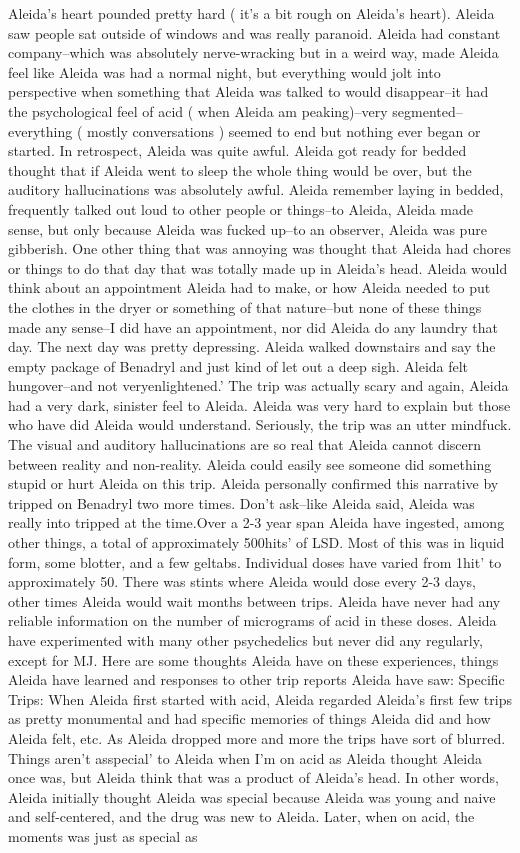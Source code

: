 \documentclass[12pt]{book}
\begin{document}
Aleida's heart pounded pretty hard ( it's a bit rough on Aleida's heart). Aleida saw people sat outside of windows and was really paranoid. Aleida had constant company--which was absolutely nerve-wracking but in a weird way, made Aleida feel like Aleida was had a normal night, but everything would jolt into perspective when something that Aleida was talked to would disappear--it had the psychological feel of acid ( when Aleida am peaking)--very segmented--everything ( mostly conversations ) seemed to end but nothing ever began or started. In retrospect, Aleida was quite awful. Aleida got ready for bedded thought that if Aleida went to sleep the whole thing would be over, but the auditory hallucinations was absolutely awful. Aleida remember laying in bedded, frequently talked out loud to other people or things--to Aleida, Aleida made sense, but only because Aleida was fucked up--to an observer, Aleida was pure gibberish. One other thing that was annoying was thought that Aleida had chores or things to do that day that was totally made up in Aleida's head. Aleida would think about an appointment Aleida had to make, or how Aleida needed to put the clothes in the dryer or something of that nature--but none of these things made any sense--I did have an appointment, nor did Aleida do any laundry that day. The next day was pretty depressing. Aleida walked downstairs and say the empty package of Benadryl and just kind of let out a deep sigh. Aleida felt hungover--and not veryenlightened.' The trip was actually scary and again, Aleida had a very dark, sinister feel to Aleida. Aleida was very hard to explain but those who have did Aleida would understand. Seriously, the trip was an utter mindfuck. The visual and auditory hallucinations are so real that Aleida cannot discern between reality and non-reality. Aleida could easily see someone did something stupid or hurt Aleida on this trip. Aleida personally confirmed this narrative by tripped on Benadryl two more times. Don't ask--like Aleida said, Aleida was really into tripped at the time.Over a 2-3 year span Aleida have ingested, among other things, a total of approximately 500hits' of LSD. Most of this was in liquid form, some blotter, and a few geltabs. Individual doses have varied from 1hit' to approximately 50. There was stints where Aleida would dose every 2-3 days, other times Aleida would wait months between trips. Aleida have never had any reliable information on the number of micrograms of acid in these doses. Aleida have experimented with many other psychedelics but never did any regularly, except for MJ. Here are some thoughts Aleida have on these experiences, things Aleida have learned and responses to other trip reports Aleida have saw: Specific Trips: When Aleida first started with acid, Aleida regarded Aleida's first few trips as pretty monumental and had specific memories of things Aleida did and how Aleida felt, etc. As Aleida dropped more and more the trips have sort of blurred. Things aren't asspecial' to Aleida when I'm on acid as Aleida thought Aleida once was, but Aleida think that was a product of Aleida's head. In other words, Aleida initially thought Aleida was special because Aleida was young and naive and self-centered, and the drug was new to Aleida. Later, when on acid, the moments was just as special as 
\end{document}

